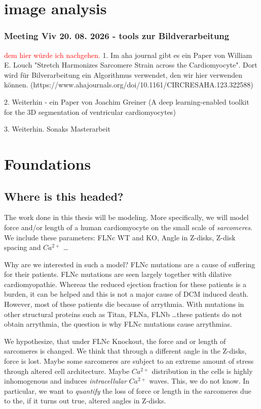 
\chapter{image analysis}
\subsection*{Meeting Viv 20. 08. 2026 - tools zur Bildverarbeitung}
\textcolor{red}{dem hier würde ich nachgehen.}
1. Im aha journal gibt es ein Paper von William E. Louch "Stretch Harmonizes Sarcomere Strain across the Cardiomyocyte". Dort wird für Bilverarbeitung ein Algorithmus verwendet, den wir hier verwenden können. (https://www.ahajournals.org/doi/10.1161/CIRCRESAHA.123.322588)


2. Weiterhin - ein Paper von Joachim Greiner (A deep learning-enabled toolkit for the 3D segmentation
of ventricular cardiomyocytes)

3. Weiterhin. Sonaks Masterarbeit


\chapter{Foundations}\label{SF}
\section{Where is this headed?}
The work done in this thesis will be modeling. More specifically, we will model force and/or length of a human cardiomyocyte on the small scale of \textit{sarcomeres}. We include these parameters: FLNc WT and KO, Angle in Z-disks, Z-disk spacing and $Ca^{2+}$ \dots \newline 



Why are we interested in such a model? FLNc mutations are a cause of suffering for their patients. FLNc mutations are seen largely together with dilative cardiomyopathie. Whereas the reduced ejection fraction for these patients is a burden, it can be helped and this is not a major cause of DCM induced death. However, most of these patients die because of arrythmia. With mutations in other structural proteins such as Titan, FLNa, FLNb \dots these patients do not obtain arrythmia, the question is why FLNc mutations cause arrythmias. \newline 


We hypothesize, that under FLNc Knockout, the force and or length of sarcomeres is changed. We think that through a different angle in the Z-disks, force is lost. Maybe some sarcomeres are subject to an extreme amount of stress through altered cell architecture. Maybe $Ca^{2+}$ distribution in the cells is highly inhomogenous and induces \textit{intracellular} $Ca^{2+}$ waves. This, we do not know. In particular, we want to \textit{quantify} the loss of force or length in the sarcomeres due to the, if it turns out true, altered angles in Z-disks. \newline 

